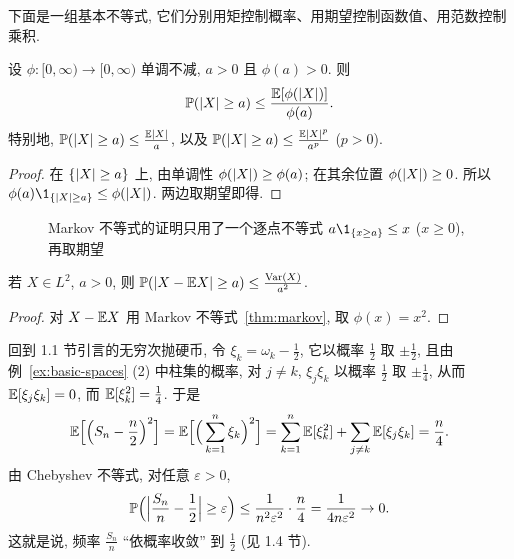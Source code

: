 下面是一组基本不等式, 它们分别用矩控制概率、用期望控制函数值、用范数控制乘积.

\begin{theorem}\label{thm:markov}
设 $\phi:[0,\infty)\to[0,\infty)$ 单调不减, $a>0$ 且 $\phi(a)>0$. 则
\[
\P(\abs{X}\ge a)\le\frac{\E[\phi(\abs{X})]}{\phi(a)}.
\]
特别地, $\P(\abs{X}\ge a)\le\frac{\E\abs{X}}{a}$, 以及 $\P(\abs{X}\ge a)\le\frac{\E\abs{X}^p}{a^p}$ ($p>0$).
\end{theorem}

\begin{proof}
在 $\{\abs{X}\ge a\}$ 上, 由单调性 $\phi(\abs{X})\ge\phi(a)$; 在其余位置 $\phi(\abs{X})\ge0$. 所以 $\phi(a)\1_{\{\abs{X}\ge a\}}\le\phi(\abs{X})$. 两边取期望即得.
\end{proof}

\begin{figure}[htbp]
\centering
{}
\caption{Markov 不等式的证明只用了一个逐点不等式 $a\1_{\{x\ge a\}}\le x$ ($x\ge0$), 再取期望}
\label{fig:markov}
\end{figure}

\begin{corollary}\label{cor:chebyshev}
若 $X\in L^2$, $a>0$, 则 $\P(\abs{X-\E X}\ge a)\le\frac{\Var(X)}{a^2}$.
\end{corollary}

\begin{proof}
对 $X-\E X$ 用 Markov 不等式~\ref{thm:markov}, 取 $\phi(x)=x^2$.
\end{proof}

\begin{example}[抛硬币的弱大数定律]\label{ex:wlln}
回到 1.1 节引言的无穷次抛硬币, 令 $\xi_k=\omega_k-\frac{1}{2}$, 它以概率 $\frac{1}{2}$ 取 $\pm\frac{1}{2}$, 且由例~\ref{ex:basic-spaces} (2) 中柱集的概率, 对 $j\ne k$, $\xi_j\xi_k$ 以概率 $\frac{1}{2}$ 取 $\pm\frac{1}{4}$, 从而 $\E[\xi_j\xi_k]=0$, 而 $\E[\xi_k^2]=\frac{1}{4}$. 于是
\[
\E\Big[\Big(S_n-\frac{n}{2}\Big)^2\Big]=\E\Big[\Big(\sum_{k=1}^n\xi_k\Big)^2\Big]=\sum_{k=1}^n\E[\xi_k^2]+\sum_{j\ne k}\E[\xi_j\xi_k]=\frac{n}{4}.
\]
由 Chebyshev 不等式, 对任意 $\varepsilon>0$,
\[
\P\Big(\Big|\frac{S_n}{n}-\frac{1}{2}\Big|\ge\varepsilon\Big)\le\frac{1}{n^2\varepsilon^2}\cdot\frac{n}{4}=\frac{1}{4n\varepsilon^2}\to0.
\]
这就是说, 频率 $\frac{S_n}{n}$ ``依概率收敛'' 到 $\frac{1}{2}$ (见 1.4 节).
\end{example}

